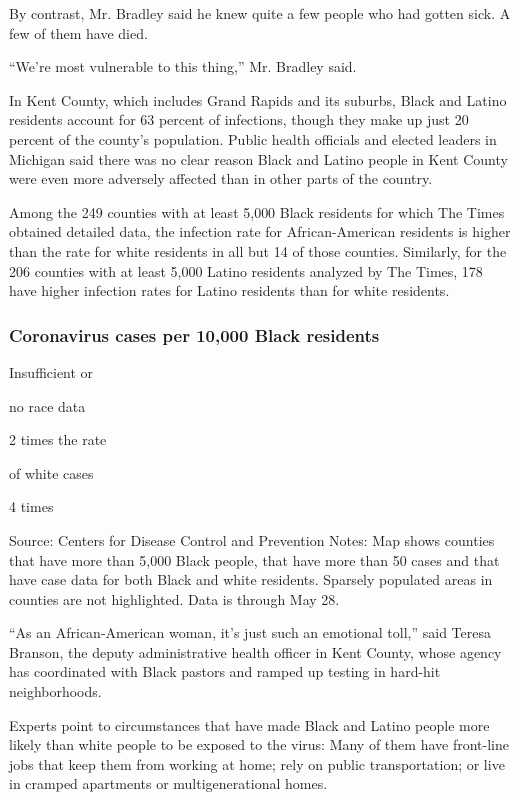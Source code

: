 By contrast, Mr. Bradley said he knew quite a few people who had gotten
sick. A few of them have died.

``We're most vulnerable to this thing,'' Mr. Bradley said.

In Kent County, which includes Grand Rapids and its suburbs, Black and
Latino residents account for 63 percent of infections, though they make
up just 20 percent of the county's population. Public health officials
and elected leaders in Michigan said there was no clear reason Black and
Latino people in Kent County were even more adversely affected than in
other parts of the country.

Among the 249 counties with at least 5,000 Black residents for which The
Times obtained detailed data, the infection rate for African-American
residents is higher than the rate for white residents in all but 14 of
those counties. Similarly, for the 206 counties with at least 5,000
Latino residents analyzed by The Times, 178 have higher infection rates
for Latino residents than for white residents.

\hypertarget{coronavirus-cases-per-10000-black-residents}{%
\subsubsection{Coronavirus cases per 10,000 Black
residents}\label{coronavirus-cases-per-10000-black-residents}}

Insufficient or

no race data

2 times the rate

of white cases

4 times

Source: Centers for Disease Control and Prevention \textbar{} Notes: Map
shows counties that have more than 5,000 Black people, that have more
than 50 cases and that have case data for both Black and white
residents. Sparsely populated areas in counties are not highlighted.
Data is through May 28.

``As an African-American woman, it's just such an emotional toll,'' said
Teresa Branson, the deputy administrative health officer in Kent County,
whose agency has coordinated with Black pastors and ramped up testing in
hard-hit neighborhoods.

Experts point to circumstances that have made Black and Latino people
more likely than white people to be exposed to the virus: Many of them
have front-line jobs that keep them from working at home; rely on public
transportation; or live in cramped apartments or multigenerational
homes.

